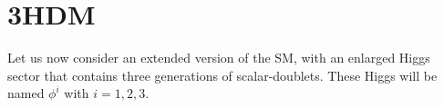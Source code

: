 
\newpage 

\section{3HDM}

Let us now consider an extended version of the SM, with an enlarged Higgs sector that contains three generations of scalar-doublets. These Higgs will be named $\phi^i$ with $i={1,2,3}$. 
